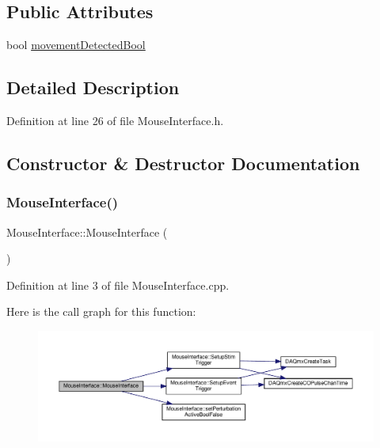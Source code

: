 \subsection*{Public Attributes}
\begin{DoxyCompactItemize}
\item 
bool \hyperlink{class_mouse_interface_a4186b7fa2d8eaef8bb90ad11fe7f07ef}{movement\+Detected\+Bool}
\end{DoxyCompactItemize}


\subsection{Detailed Description}


Definition at line 26 of file Mouse\+Interface.\+h.



\subsection{Constructor \& Destructor Documentation}
\mbox{\label{class_mouse_interface_a36669205adb92c00543ba26d73661c01}} 
\subsubsection{\texorpdfstring{Mouse\+Interface()}{MouseInterface()}}
{\footnotesize\ttfamily Mouse\+Interface\+::\+Mouse\+Interface (\begin{DoxyParamCaption}{ }\end{DoxyParamCaption})}



Definition at line 3 of file Mouse\+Interface.\+cpp.

Here is the call graph for this function\+:
\nopagebreak
\begin{figure}[H]
\begin{center}
\leavevmode
\includegraphics[width=350pt]{class_mouse_interface_a36669205adb92c00543ba26d73661c01_cgraph}
\end{center}
\end{figure}
\mbox{\label{class_mouse_interface_a74e418ec1c00dda177cbcdbd3bcf8258}} 
